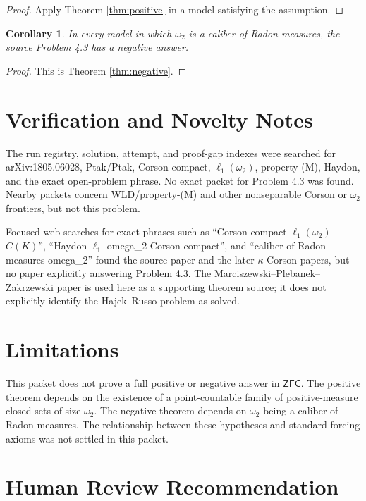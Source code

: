 \documentclass[11pt]{article}
\newtheorem{corollary}{Corollary}
\newcommand{\ZFC}{\mathsf{ZFC}}
\newcommand{\ellone}{\ell_1}
\newcommand{\omegatwo}{\omega_2}
\begin{document}
\begin{proof}
Apply Theorem \ref{thm:positive} in a model satisfying the assumption.
\end{proof}

\begin{corollary}
In every model in which \(\omegatwo\) is a caliber of Radon measures, the
source Problem 4.3 has a negative answer.
\end{corollary}

\begin{proof}
This is Theorem \ref{thm:negative}.
\end{proof}

\section*{Verification and Novelty Notes}

The run registry, solution, attempt, and proof-gap indexes were searched for
arXiv:1805.06028, Ptak/Ptak, Corson compact, \(\ellone(\omegatwo)\),
property (M), Haydon, and the exact open-problem phrase.  No exact packet for
Problem 4.3 was found.  Nearby packets concern WLD/property-(M) and other
nonseparable Corson or \(\omega_2\) frontiers, but not this problem.

Focused web searches for exact phrases such as ``Corson compact
\(\ell_1(\omega_2)\) \(C(K)\)'', ``Haydon \(\ell_1\) omega\_2 Corson
compact'', and ``caliber of Radon measures omega\_2'' found the source paper
and the later \(\kappa\)-Corson papers, but no paper explicitly answering
Problem 4.3.  The Marciszewski--Plebanek--Zakrzewski paper is used here as a
supporting theorem source; it does not explicitly identify the Hajek--Russo
problem as solved.

\section*{Limitations}

This packet does not prove a full positive or negative answer in \(\ZFC\).
The positive theorem depends on the existence of a point-countable family of
positive-measure closed sets of size \(\omegatwo\).  The negative theorem
depends on \(\omegatwo\) being a caliber of Radon measures.  The relationship
between these hypotheses and standard forcing axioms was not settled in this
packet.

\section*{Human Review Recommendation}
\end{document}
